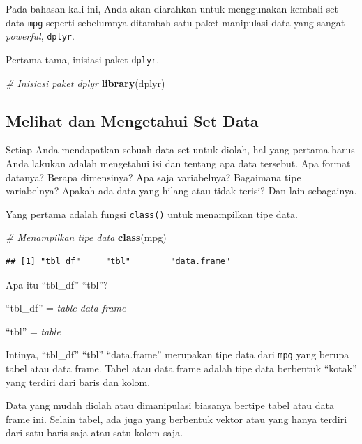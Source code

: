 \documentclass[openany]{book}
\newenvironment{Shaded}{\begin{snugshade}}{\end{snugshade}}
\newcommand{\KeywordTok}[1]{\textcolor[rgb]{0.13,0.29,0.53}{\textbf{#1}}}
\newcommand{\CommentTok}[1]{\textcolor[rgb]{0.56,0.35,0.01}{\textit{#1}}}
\newcommand{\NormalTok}[1]{#1}
\begin{document}
Pada bahasan kali ini, Anda akan diarahkan untuk menggunakan kembali set
data \texttt{mpg} seperti sebelumnya ditambah satu paket manipulasi data
yang sangat \emph{powerful}, \texttt{dplyr}.

Pertama-tama, inisiasi paket \texttt{dplyr}.

\begin{Shaded}
\begin{Highlighting}[]
\CommentTok{# Inisiasi paket dplyr}
\KeywordTok{library}\NormalTok{(dplyr)}
\end{Highlighting}
\end{Shaded}

\subsection{Melihat dan Mengetahui Set
Data}\label{melihat-dan-mengetahui-set-data}

Setiap Anda mendapatkan sebuah data set untuk diolah, hal yang pertama
harus Anda lakukan adalah mengetahui isi dan tentang apa data tersebut.
Apa format datanya? Berapa dimensinya? Apa saja variabelnya? Bagaimana
tipe variabelnya? Apakah ada data yang hilang atau tidak terisi? Dan
lain sebagainya.

Yang pertama adalah fungsi \texttt{class()} untuk menampilkan tipe data.

\begin{Shaded}
\begin{Highlighting}[]
\CommentTok{# Menampilkan tipe data}
\KeywordTok{class}\NormalTok{(mpg)}
\end{Highlighting}
\end{Shaded}

\begin{verbatim}
## [1] "tbl_df"     "tbl"        "data.frame"
\end{verbatim}

Apa itu ``tbl\_df'' ``tbl''?

``tbl\_df'' = \emph{table data frame}

``tbl'' = \emph{table}

Intinya, ``tbl\_df'' ``tbl'' ``data.frame'' merupakan tipe data dari
\texttt{mpg} yang berupa tabel atau data frame. Tabel atau data frame
adalah tipe data berbentuk ``kotak'' yang terdiri dari baris dan kolom.

Data yang mudah diolah atau dimanipulasi biasanya bertipe tabel atau
data frame ini. Selain tabel, ada juga yang berbentuk vektor atau yang
hanya terdiri dari satu baris saja atau satu kolom saja.
\end{document}
